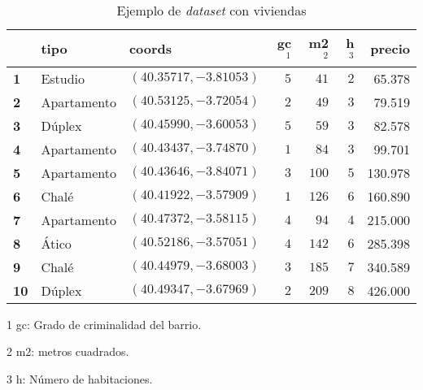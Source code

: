 \begin{table}[H]
  \centering
  \begin{threeparttable}[t]
       \begin{tabular}{l|llrrrr}
        \toprule
        {} &   \textbf{tipo} & \textbf{coords} & \textbf{gc$^1$} & \textbf{m2$^2$} &  \textbf{h$^3$} & \textbf{precio} \\
        \midrule
        \textbf{1} &       Estudio &  $(40.35717, -3.81053)$ &   $5$ &   $41$ & $2$ &  65.378 \\
        \textbf{2} &   Apartamento &  $(40.53125, -3.72054)$ &   $2$ &   $49$ &  $3$ & 79.519 \\
        \textbf{3} &        Dúplex & $(40.45990, -3.60053)$  &   $5$ &   $59$ &  $3$ & 82.578 \\
        \textbf{4} &   Apartamento &  $(40.43437, -3.74870)$ &   $1$ &   $84$ &  $3$ & 99.701 \\
        \textbf{5} &   Apartamento &  $(40.43646, -3.84071)$ &   $3$ &  $100$ & $5$ & 130.978 \\
        \textbf{6} &         Chalé &  $(40.41922, -3.57909)$ &   $1$ &  $126$ & $6$ & 160.890 \\
        \textbf{7} &   Apartamento &  $(40.47372, -3.58115)$ &   $4$ &   $94$ & $4$ & 215.000 \\
        \textbf{8} &         Ático &  $(40.52186, -3.57051)$ &   $4$ &  $142$ & $6$ & 285.398 \\
        \textbf{9} &         Chalé &  $(40.44979, -3.68003)$ &   $3$ &  $185$ & $7$ & 340.589 \\
        \textbf{10} &       Dúplex & $(40.49347, -3.67969)$ & $2$ &  $209$ & $8$ & 426.000 \\
        \bottomrule
         \end{tabular}
     \begin{tablenotes}
     \item[1] gc: Grado de criminalidad del barrio.
     \item[2] m2: metros cuadrados.
     \item[3] h: Número de habitaciones.
   \end{tablenotes}
    \end{threeparttable}%
\caption{Ejemplo de \textit{dataset} con viviendas}
  \label{tab:houses}
\end{table}%




